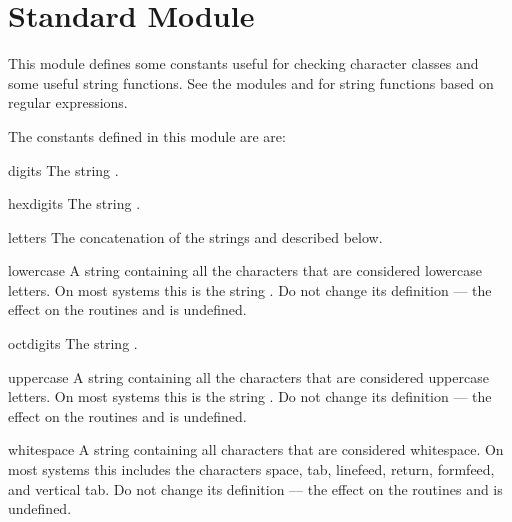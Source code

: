 \section{Standard Module }
\label{module-string}


This module defines some constants useful for checking character
classes and some useful string functions.  See the modules
 and  for string functions based on regular
expressions.

The constants defined in this module are are:

\renewcommand{\indexsubitem}{(data in module string)}
\begin{datadesc}{digits}
  The string .
\end{datadesc}

\begin{datadesc}{hexdigits}
  The string .
\end{datadesc}

\begin{datadesc}{letters}
  The concatenation of the strings  and
   described below.
\end{datadesc}

\begin{datadesc}{lowercase}
  A string containing all the characters that are considered lowercase
  letters.  On most systems this is the string
  .  Do not change its definition ---
  the effect on the routines  and  is
  undefined.
\end{datadesc}

\begin{datadesc}{octdigits}
  The string .
\end{datadesc}

\begin{datadesc}{uppercase}
  A string containing all the characters that are considered uppercase
  letters.  On most systems this is the string
  .  Do not change its definition ---
  the effect on the routines  and  is
  undefined.
\end{datadesc}

\begin{datadesc}{whitespace}
  A string containing all characters that are considered whitespace.
  On most systems this includes the characters space, tab, linefeed,
  return, formfeed, and vertical tab.  Do not change its definition ---
  the effect on the routines  and  is
  undefined.
\end{datadesc}

